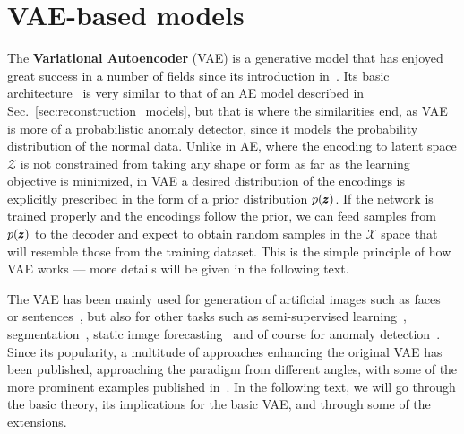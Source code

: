\section{VAE-based models} \label{sec:vae_models}
The \textbf{Variational Autoencoder} (VAE) is a generative model that has enjoyed great success in a number of fields since its introduction in~\cite{kingma2013vae}. Its basic architecture~\cite{kingma2019introduction} is very similar to that of an AE model described in Sec.~\ref{sec:reconstruction_models}, but that is where the similarities end, as VAE is more of a probabilistic anomaly detector, since it models the probability distribution of the normal data. Unlike in AE, where the encoding to latent space $\mathcal{Z}$ is not constrained from taking any shape or form as far as the learning objective is minimized, in VAE a desired distribution of the encodings is explicitly prescribed in the form of a prior distribution $p(\pmb{{z}})$. If the network is trained properly and the encodings follow the prior, we can feed samples from $p(\pmb{{z}})$ to the decoder and expect to obtain random samples in the $\mathcal{X}$ space that will resemble those from the training dataset. This is the simple principle of how VAE works --- more details will be given in the following text.

The VAE has been mainly used for generation of artificial images such as faces~\cite{rezende2014stochastic} or sentences~\cite{bowman2015generating}, but also for other tasks such as semi-supervised learning~\cite{kingma2014semi}, segmentation~\cite{sohn2015learning}, static image forecasting~\cite{walker2016uncertain} and of course for anomaly detection~\cite{an2015variational,xu2018unsupervised,solch2016variational}. Since its popularity, a multitude of approaches enhancing the original VAE has been published, approaching the paradigm from different angles, with some of the more prominent examples published in~\cite{higgins2017beta,zhao2017infovae,tolstikhin2017wasserstein,makhzani2015adversarial,pu2017adversarial}. In the following text, we will go through the basic theory, its implications for the basic VAE, and through some of the extensions. 

